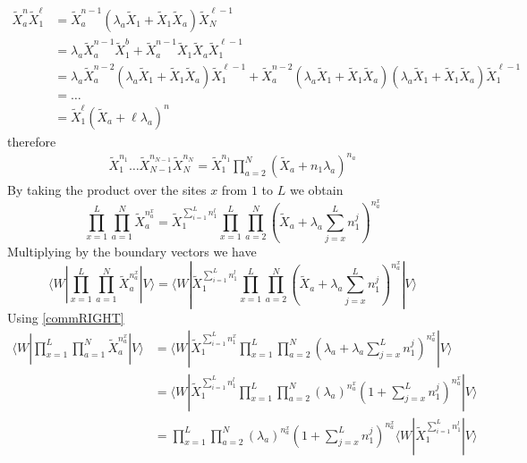 \documentclass[11pt]{article}
\numberwithin{equation}{section}
\numberwithin{equation}{subsection}
\begin{document}
\begin{align*}
	\widetilde{X}_{a}^{n}\widetilde{X}_{1}^{\ell}&=\widetilde{X}_{a}^{n-1}\left(\lambda_{a}\widetilde{X}_{1}+\widetilde{X}_{1}\widetilde{X}_{a}\right)\widetilde{X}_{N}^{\ell-1}
	\\&=\lambda_{a}\widetilde{X}_{a}^{n-1}\widetilde{X}_{1}^{b}+\widetilde{X}_{a}^{n-1}\widetilde{X}_{1}\widetilde{X}_{a}\widetilde{X}_{1}^{\ell-1}
	\\&=
	\lambda_{a}\widetilde{X}_{a}^{n-2}\left(\lambda_{a}\widetilde{X}_{1}+\widetilde{X}_{1}\widetilde{X}_{a}\right)\widetilde{X}_{1}^{\ell-1}+\widetilde{X}_{a}^{n-2}\left(\lambda_{a}\widetilde{X}_{1}+\widetilde{X}_{1}\widetilde{X}_{a}\right)\left(\lambda_{a}\widetilde{X}_{1}+\widetilde{X}_{1}\widetilde{X}_{a}\right)\widetilde{X}_{1}^{\ell -1}
	\\&=\ldots\\&=
	\widetilde{X}_{1}^{\ell}\left(\widetilde{X}_{a}+\ell\lambda_{a}\right)^{n}
\end{align*}
therefore 
\begin{align*}
	\widetilde{X}_{1}^{n_{1}}\ldots\widetilde{X}_{N-1}^{n_{N-1}}\widetilde{X}_{N}^{n_{N}}=\widetilde{X}_{1}^{n_{1}}\prod_{a=2}^{N}\left(\widetilde{X}_{a}+n_{1}\lambda_{a}\right)^{n_{a}}
\end{align*}
By taking the product over the sites $x$ from $1$ to $L$ we obtain 
\begin{equation}
	\prod_{x=1}^{L}\prod_{a=1}^{N}\widetilde{X}_{a}^{n_{a}^{x}}=\widetilde{X}_{1}^{\sum_{i=1}^{L}n_{1}^{l}}\prod_{x=1}^{L}\prod_{a=2}^{N}\left(\widetilde{X}_{a}+\lambda_{a}\sum_{j=x}^{L}n_{1}^{j}\right)^{n_{a}^{x}}
\end{equation}
Multiplying by the boundary vectors we have 
\begin{equation}
	\langle W|\prod_{x=1}^{L}\prod_{a=1}^{N}\widetilde{X}_{a}^{n_{a}^{x}}
	|V \rangle=\langle W|\widetilde{X}_{1}^{\sum_{i=1}^{L}n_{1}^{l}}\prod_{x=1}^{L}\prod_{a=2}^{N}\left(\widetilde{X}_{a}+\lambda_{a}\sum_{j=x}^{L}n_{1}^{j}\right)^{n_{a}^{x}}|V\rangle
\end{equation}
Using \eqref{commRIGHT}
\begin{align*}
	\langle W|\prod_{x=1}^{L}\prod_{a=1}^{N}\widetilde{X}_{a}^{n_{a}^{x}}
	|V \rangle&=\langle W|\widetilde{X}_{1}^{\sum_{i=1}^{L}n_{1}^{x}}\prod_{x=1}^{L}\prod_{a=2}^{N}\left(\lambda_{a}+\lambda_{a}\sum_{j=x}^{L}n_{1}^{j}\right)^{n_{a}^{x}}|V\rangle
	\\&=
	\langle W|\widetilde{X}_{1}^{\sum_{i=1}^{L}n_{1}^{l}}\prod_{x=1}^{L}\prod_{a=2}^{N}\left(\lambda_{a}\right)^{n_{a}^{x}}\left(1+\sum_{j=x}^{L}n_{1}^{j}\right)^{n_{a}^{x}}|V\rangle
	\\&=
	\prod_{x=1}^{L}\prod_{a=2}^{N}\left(\lambda_{a}\right)^{n_{a}^{x}}\left(1+\sum_{j=x}^{L}n_{1}^{j}\right)^{n_{a}^{x}}\langle W|\widetilde{X}_{1}^{\sum_{i=1}^{L}n_{1}^{l}}|V\rangle
\end{align*}
\end{document}
